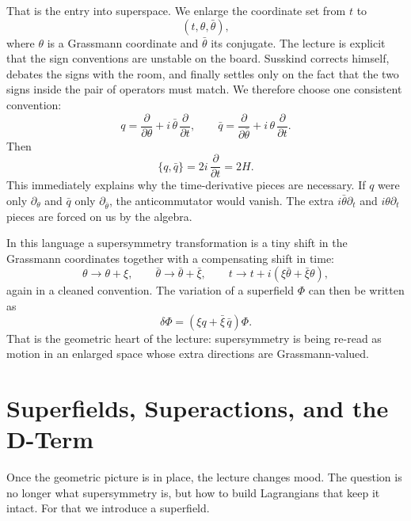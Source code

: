 That is the entry into superspace. We enlarge the coordinate set from \(t\) to
\begin{equation}
(t,\theta,\bar\theta),
\end{equation}
where \(\theta\) is a Grassmann coordinate and \(\bar\theta\) its conjugate. The lecture is explicit that the sign conventions are unstable on the board. Susskind corrects himself, debates the signs with the room, and finally settles only on the fact that the two signs inside the pair of operators must match. We therefore choose one consistent convention:
\begin{equation}
q=\frac{\partial}{\partial\theta}+i\,\bar\theta\,\frac{\partial}{\partial t},
\qquad
\bar q=\frac{\partial}{\partial\bar\theta}+i\,\theta\,\frac{\partial}{\partial t}.
\end{equation}
Then
\begin{equation}
\{q,\bar q\}=2i\,\frac{\partial}{\partial t}=2H.
\end{equation}
This immediately explains why the time-derivative pieces are necessary. If \(q\) were only \(\partial_\theta\) and \(\bar q\) only \(\partial_{\bar\theta}\), the anticommutator would vanish. The extra \(i\bar\theta\partial_t\) and \(i\theta\partial_t\) pieces are forced on us by the algebra.

In this language a supersymmetry transformation is a tiny shift in the Grassmann coordinates together with a compensating shift in time:
\begin{equation}
\theta\to\theta+\xi,
\qquad
\bar\theta\to\bar\theta+\bar\xi,
\qquad
t\to t+i\left(\xi\bar\theta+\bar\xi\theta\right),
\end{equation}
again in a cleaned convention. The variation of a superfield \(\Phi\) can then be written as
\begin{equation}
\delta\Phi=\left(\xi q+\bar\xi\,\bar q\right)\Phi.
\end{equation}
That is the geometric heart of the lecture: supersymmetry is being re-read as motion in an enlarged space whose extra directions are Grassmann-valued.

\section{Superfields, Superactions, and the D-Term}

Once the geometric picture is in place, the lecture changes mood. The question is no longer what supersymmetry is, but how to build Lagrangians that keep it intact. For that we introduce a superfield.

